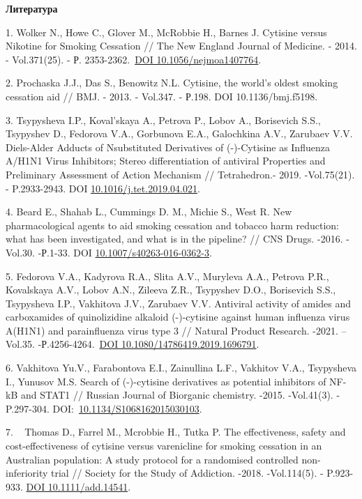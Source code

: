 {\bfseries Литература}

1. Wolker N., Howe C., Glover M., McRobbie H., Barnes J. Cytisine versus
Nikotine for Smoking Cessation // The New England Journal of Medicine. -
2014. - Vol.371(25). - Р.
2353-2362.~\href{https://doi.org/10.1056/nejmoa1407764}{DOI
10.1056/nejmoa1407764}.

2. Prochaska J.J., Das S., Benowitz N.L. Cytisine, the world's oldest
smoking cessation aid // BMJ. ­- 2013. - Vol.347. - Р.198. DOI
10.1136/bmj.f5198.

3. Tsypysheva I.P., Koval'skaya A., Petrova P., Lobov A., Borisevich
S.S., Tsypyshev D., Fedorova V.A., Gorbunova E.A., Galochkina A.V.,
Zarubaev V.V. Diels-Alder Adducts of Nsubstituted Derivatives of
(-)-Cytisine as Influenza A/H1N1 Virus Inhibitors; Stereo
differentiation of antiviral Properties and Preliminary Assessment of
Action Mechanism // Tetrahedron.- 2019. -Vol.75(21). - P.2933-2943.
DOI
\href{https://doi.org/10.1016/j.tet.2019.04.021}{10.1016/j.tet.2019.04.021}.

4. Beard E., Shahab L., Cummings D. M., Michie S., West R. New
pharmacological agents to aid smoking cessation and tobacco harm
reduction: what has been investigated, and what is in the pipeline? //
CNS Drugs. -2016. -Vol.30. -Р.1-33. DOI
\href{https://doi.org/10.1007/s40263-016-0362-3}{10.1007/s40263-016-0362-3}.

5. Fedorova V.A., Kadyrova R.A., Slita A.V., Muryleva A.A., Petrova
P.R., Kovalskaya A.V., Lobov A.N., Zileeva Z.R., Tsypyshev D.O.,
Borisevich S.S., Tsypysheva I.P., Vakhitova J.V., Zarubaev V.V.
Antiviral activity of amides and carboxamides of quinolizidine alkaloid
(-)-cytisine against human influenza virus A(H1N1) and parainfluenza
virus type 3 // Natural Product Research. -2021. -- Vol.35.
-Р.4256-4264.~\href{https://doi.org/10.1080/14786419.2019.1696791}{DOI
10.1080/14786419.2019.1696791}.

6. Vakhitova Yu.V., Farabontova E.I., Zainullina L.F., Vakhitov V.A.,
Tsypysheva I., Yunusov M.S. Search of (-)-cytisine derivatives as
potential inhibitors of NF-kB and STAT1 // Russian Journal of Biorganic
chemistry. -2015. -Vol.41(3). - P.297-304.
DOI:~\href{http://dx.doi.org/10.1134/S1068162015030103}{10.1134/S1068162015030103}.

7. ~ Thomas D., Farrel M., Mcrobbie H., Tutka P. The effectiveness,
safety and cost-effectiveness of cytisine versus varenicline for smoking
cessation in an Australian population: A study protocol for a randomised
controlled non-inferiority trial // Society for the Study of Addiction.
-2018. -Vol.114(5). - P.923-933.
\href{https://doi.org/10.1111/add.14541}{DOI 10.1111/add.14541}.


